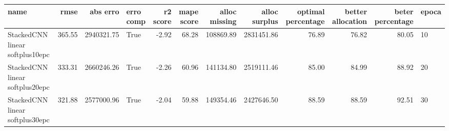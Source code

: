 \begin{tabular}{lrrlrrrrrrrl}
\toprule
name & rmse & abs erro & erro comp & r2 score & mape score & alloc missing & alloc surplus & optimal percentage & better allocation & beter percentage & epoca \\
\midrule
StackedCNN linear softplus10epc & 365.55 & 2940321.75 & True & -2.92 & 68.28 & 108869.89 & 2831451.86 & 76.89 & 76.82 & 80.05 & 10 \\
StackedCNN linear softplus20epc & 333.31 & 2660246.26 & True & -2.26 & 60.96 & 141134.80 & 2519111.46 & 85.00 & 84.99 & 88.92 & 20 \\
StackedCNN linear softplus30epc & 321.88 & 2577000.96 & True & -2.04 & 59.88 & 149354.46 & 2427646.50 & 88.59 & 88.59 & 92.51 & 30 \\
\bottomrule
\end{tabular}

